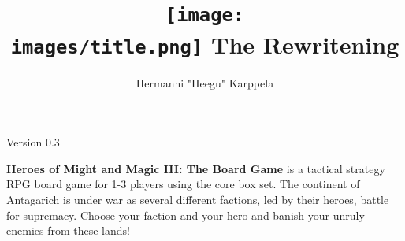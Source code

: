 \documentclass[12pt]{article}
\def\assets{assets}
\def\images{\assets/images}
\begin{document}
\title{\texttt{[image: \\images/title.png]} The Rewritening}

\author{Hermanni "Heegu" Karppela}
\maketitle

\begin{center}
Version 0.3
\end{center}

\tableofcontents

\clearpage

\textbf{Heroes of Might and Magic III: The Board Game} is a tactical strategy RPG board game for 1-3 players using the core box set.
The continent of Antagarich is under war as several different factions, led by their heroes, battle for supremacy. Choose your faction and your hero and banish your unruly enemies from these lands!
\bigbreak






























\end{document}
